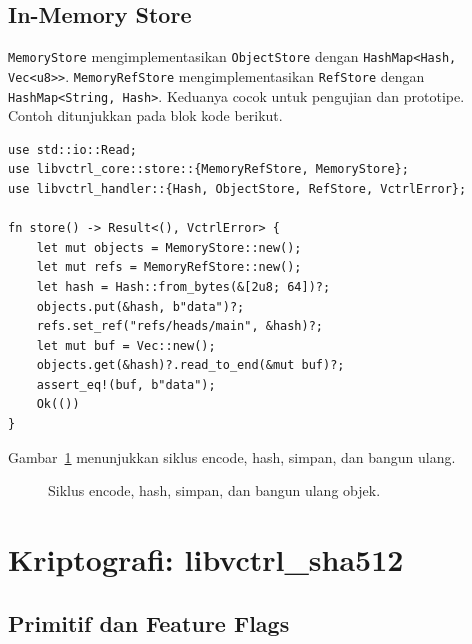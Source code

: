 \documentclass[11pt,a4paper]{article}
\begin{document}
\subsection{In-Memory Store}

\texttt{MemoryStore} mengimplementasikan \texttt{ObjectStore} dengan \texttt{HashMap<Hash, Vec<u8>>}. \texttt{MemoryRefStore} mengimplementasikan \texttt{RefStore} dengan \texttt{HashMap<String, Hash>}. Keduanya cocok untuk pengujian dan prototipe. Contoh ditunjukkan pada blok kode berikut.

\begin{lstlisting}[style=code]
use std::io::Read;
use libvctrl_core::store::{MemoryRefStore, MemoryStore};
use libvctrl_handler::{Hash, ObjectStore, RefStore, VctrlError};

fn store() -> Result<(), VctrlError> {
    let mut objects = MemoryStore::new();
    let mut refs = MemoryRefStore::new();
    let hash = Hash::from_bytes(&[2u8; 64])?;
    objects.put(&hash, b"data")?;
    refs.set_ref("refs/heads/main", &hash)?;
    let mut buf = Vec::new();
    objects.get(&hash)?.read_to_end(&mut buf)?;
    assert_eq!(buf, b"data");
    Ok(())
}
\end{lstlisting}

Gambar~\ref{fig:encodehash} menunjukkan siklus encode, hash, simpan, dan bangun ulang.

\begin{figure}[H]
	\centering
	\caption{Siklus encode, hash, simpan, dan bangun ulang objek.}
	\label{fig:encodehash}
\end{figure}

\section{Kriptografi: libvctrl\_sha512}

\subsection{Primitif dan Feature Flags}
\end{document}
